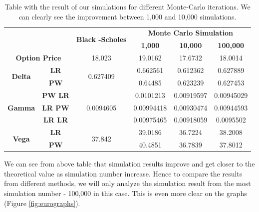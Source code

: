 \documentclass[11pt,a4paper,fleqn,draft]{article}
\begin{document}
\begin{table}
\centering
\begin{tabular}{|c|c|c|c|c|c|}
\hline
\multicolumn{2}{|c|}{\multirow{2}{*}{}}          & \multirow{2}{*}{\textbf{Black -Scholes}} & \multicolumn{3}{c|}{\textbf{Monte Carlo Simulation}} \\ \cline{4-6}
\multicolumn{2}{|c|}{}                           &                                          & \textbf{1,000}  & \textbf{10,000} & \textbf{100,000} \\ \hline
\multicolumn{2}{|c|}{\textbf{Option Price}}      & 18.023                                   & 19.0162         & 17.6732         & 18.0014          \\ \hline
\multirow{2}{*}{\textbf{Delta}} & \textbf{LR}    & \multirow{2}{*}{0.627409}                & 0.662561        & 0.612362        & 0.627889         \\ \cline{2-2} \cline{4-6}
                                & \textbf{PW}    &                                          & 0.64485         & 0.623239        & 0.627453         \\ \hline
\multirow{3}{*}{\textbf{Gamma}} & \textbf{PW LR} & \multirow{3}{*}{0.0094605}               & 0.0101213       & 0.00919597      & 0.00945029       \\ \cline{2-2} \cline{4-6}
                                & \textbf{LR PW} &                                          & 0.00994418      & 0.00930474      & 0.00944593       \\ \cline{2-2} \cline{4-6}
                                & \textbf{LR LR} &                                          & 0.00975465      & 0.00918059      & 0.0095502        \\ \hline
\multirow{2}{*}{\textbf{Vega}}  & \textbf{LR}    & \multirow{2}{*}{37.842}                  & 39.0186         & 36.7224         & 38.2008          \\ \cline{2-2} \cline{4-6}
                                & \textbf{PW}    &                                          & 40.4851         & 36.7839         & 37.8012          \\ \hline
\end{tabular}
\caption{Table with the result of our simulations for different Monte-Carlo iterations. We can clearly see the improvement between 1,000 and 10,000 simulations.}
\end{table}

We can see from above table that simulation results improve and get closer to the theoretical value as simulation number increase. Hence to compare the results from different methods, we will only analyze the simulation result from the most simulation number - 100,000 in this case. This is even more clear on the graphs (Figure \ref{fig:eurographs}).
\end{document}
